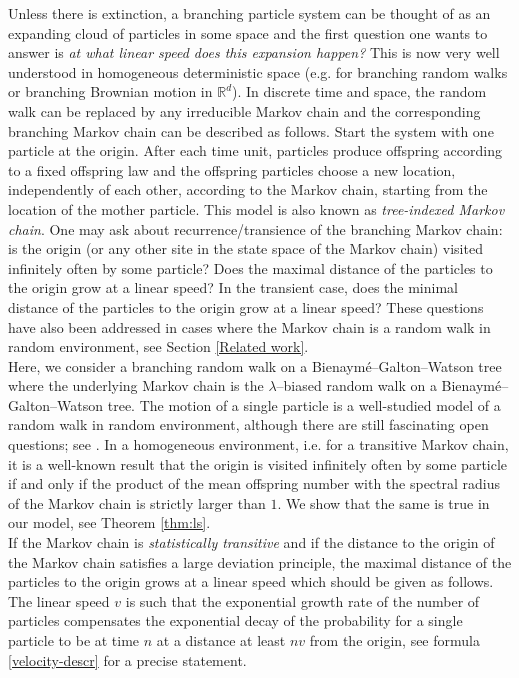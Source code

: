 \documentclass[11 pt]{article}
\theoremstyle{definition}
\numberwithin{equation}{section}
\begin{document}
Unless there is extinction, a branching particle system can be thought of as an expanding cloud of particles in some space and the first question one wants to answer is {\it at what linear speed does this expansion happen?} This is now very well understood in homogeneous deterministic space (e.g. for branching random walks or branching Brownian motion in $\mathbb{R}^d$).  
In discrete time and space, the random walk can be replaced by any irreducible Markov chain and the corresponding branching Markov chain can be described as follows. Start the system with one particle at the origin. After each time unit, particles produce offspring according to a fixed offspring law and the offspring particles choose a new location, independently of each other, according to the Markov chain, starting from the location of the mother particle. This model is also known as {\sl tree-indexed Markov chain}. One may ask about recurrence/transience of the branching Markov chain: is the origin (or any other site in the state space of the Markov chain)  visited infinitely often by some particle? Does the maximal distance of the particles to the origin grow at a linear speed? In the transient case, does the minimal distance of the particles to the origin grow at a linear speed? These questions have also been addressed in cases where the Markov chain is a random walk in random environment, see Section \ref{Related work}.\\
\noindent
Here, we consider a branching random walk on a Bienaymé--Galton--Watson tree where the underlying Markov chain is the $\lambda$--biased random walk on a Bienaymé--Galton--Watson tree. The motion of a single particle is a well-studied model of a random walk in random environment, although there are still fascinating open questions; see
\cite{lyons_probability_2016}.
In a homogeneous environment, i.e. for a transitive Markov chain, it is a well-known result \cite[Theorem 2.12]{Mueller2008} that the origin is visited infinitely often by some particle if and only if the product of the mean offspring number with the spectral radius of the Markov chain is strictly larger than $1$. We show that the same is true in our model, see Theorem \ref{thm:ls}.\\
If the Markov chain is \emph{statistically transitive} and if the distance to the origin of the Markov chain satisfies a large deviation principle, the maximal distance of the particles to the origin grows at a linear speed which should be given as follows. The linear speed $v$ is such that the exponential growth rate of the number of particles compensates the exponential decay of the probability for a single particle to be at time $n$ at a distance at least $nv$ from the origin, see formula \eqref{velocity-descr} for a precise statement. 
\end{document}
